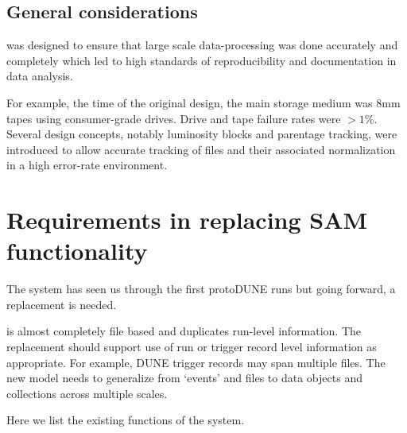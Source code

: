 \documentclass[../main-v1.tex]{subfiles}
\begin{document}
\subsection{General considerations}

 was designed to ensure that large scale data-processing was done accurately and completely  which led to  high standards of reproducibility and documentation in data analysis.

For example, the time of the original design, the main storage medium was 8mm tapes using consumer-grade drives.  Drive and tape failure rates were $> 1$\%.  Several  design concepts, notably luminosity blocks and parentage tracking, were introduced to allow accurate tracking of files and their associated normalization in a high error-rate environment. 

\section{Requirements in replacing SAM functionality }

The  system has seen us through the first protoDUNE runs but going forward, a replacement is needed. 



  is almost completely file based and duplicates run-level information.  The replacement should support use of run or trigger record level information as appropriate. 
For example,  DUNE trigger records may span multiple files. The new model needs to generalize from `events' and files to data objects and collections across multiple scales. 

Here we list the existing functions of the  system. 
\end{document}
